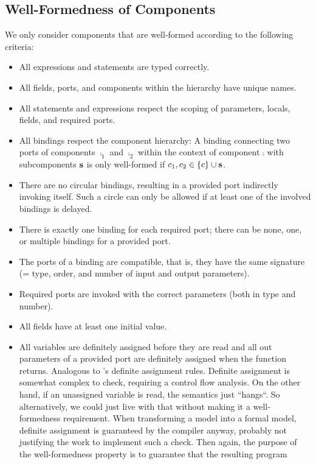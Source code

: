 \documentclass[a4paper,10pt,english]{article}
\begin{document}
\subsection{Well-Formedness of Components}
We only consider components that are well-formed according to the following criteria:
\begin{itemize}
	\item All expressions and statements are typed correctly.
	\item All fields, ports, and components within the hierarchy have unique names.
	\item All statements and expressions respect the scoping of parameters, locals, fields, and required ports.
	\item All bindings respect the component hierarchy: A binding connecting two ports of components $\comp_1$ and $\comp_2$ within
	the context of component $\comp$ with subcomponents $\mathbf{s}$ is only well-formed if $c_1, c_2 \in \{ c \} \cup
	\mathbf{s}$.
	\item There are no circular bindings, resulting in a provided port indirectly invoking itself. Such a circle can only be allowed
	if at least one of the involved bindings is delayed.
	\item There is exactly one binding for each required port; there can be none, one, or multiple bindings for a provided port.
	\item The ports of a binding are compatible, that is, they have the same signature (= type, order, and number of input and
	output parameters).
	\item Required ports are invoked with the correct parameters (both in type and number).
	\item All fields have at least one initial value.
	\item All variables are definitely assigned before they are read and all out parameters of a provided port are definitely
	assigned when the function returns. Analogous to \CSharp's definite assignment rules. Definite assignment is somewhat complex to
	check, requiring a control flow analysis. On the other hand, if an unassigned variable is read, the semantics just ``hangs``.
	So alternatively, we could just live with that without making it a well-formedness requirement. When transforming a \SSharp
	model into a formal model, definite assignment is guaranteed by the \CSharp compiler anyway, probably not justifying the work to
	implement such a check. Then again, the purpose of the well-formedness property is to guarantee that the resulting \Fil program

\end{itemize}
\end{document}
